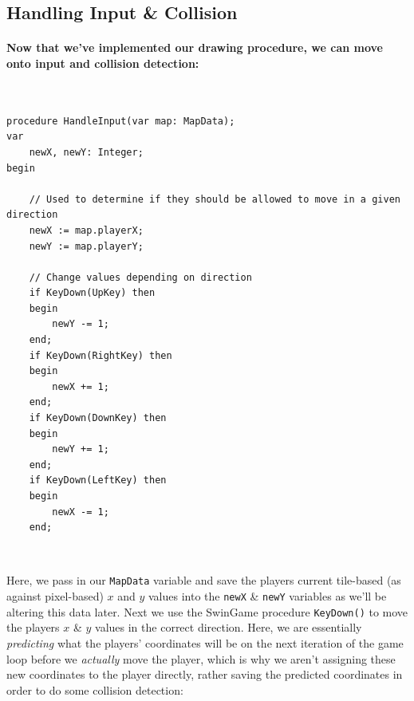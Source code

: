 \documentclass{article}
\begin{document}
\subsection{Handling Input \& Collision}
\paragraph{Now that we've implemented our drawing procedure, we can move onto input and collision detection:}\mbox{}
 
 \vspace{0.2cm}
 \
 \begin{mdframed}[backgroundcolor=darkgray]
 \begin{verbatim}
procedure HandleInput(var map: MapData);
var
	newX, newY: Integer;
begin

	// Used to determine if they should be allowed to move in a given direction
	newX := map.playerX;
	newY := map.playerY;

	// Change values depending on direction
	if KeyDown(UpKey) then
	begin
		newY -= 1;
	end;
	if KeyDown(RightKey) then
	begin
		newX += 1;
	end;
	if KeyDown(DownKey) then
	begin
		newY += 1;
	end;
	if KeyDown(LeftKey) then
	begin
		newX -= 1;
	end;
 \end{verbatim}
 \end{mdframed}
 \
 
Here, we pass in our \texttt{MapData} variable and save the players current tile-based (as against pixel-based) $x$ and $y$ values into the \texttt{newX} \& \texttt{newY} variables as we'll be altering this data later. Next we use the SwinGame procedure \texttt{KeyDown()} to move the players $x$ \& $y$ values in the correct direction. Here, we are essentially \emph{predicting} what the players' coordinates will be on the next iteration of the game loop before we \emph{actually} move the player, which is why we aren't assigning these new coordinates to the player directly, rather saving the predicted coordinates in order to do some collision detection:
 
\end{document}
